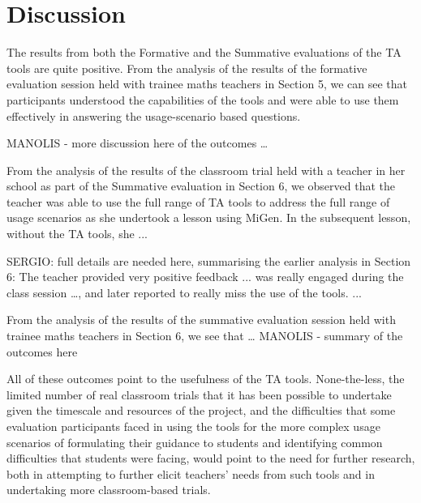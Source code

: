 
\section{Discussion}
\label{sec:discussion}

The results from both the Formative and the Summative evaluations of
the TA tools are quite positive. From the analysis of the results of
the formative evaluation session held with trainee maths teachers in
Section 5, we can see that participants understood the capabilities of
the tools and were able to use them effectively in answering the
usage-scenario based questions.

MANOLIS - more discussion here of the outcomes … 
 
From the analysis of the results of the classroom trial held with a
teacher in her school as part of the Summative evaluation in Section
6, we observed that the teacher was able to use the full range of TA
tools to address the full range of usage scenarios as she undertook a
lesson using MiGen. In the subsequent lesson, without the TA tools,
she ...

SERGIO:  full details are needed here, summarising the earlier analysis in Section 6: The teacher provided very positive feedback ... was really engaged during the class session …, and later reported to really miss the use of the tools. ...

From the analysis of the results of the summative evaluation session
held with trainee maths teachers in Section 6, we see that … MANOLIS -
summary of the outcomes here 

All of these outcomes point to the usefulness of the TA
tools. None-the-less, the limited number of real classroom trials that
it has been possible to undertake given the timescale and resources of
the project, and the difficulties that some evaluation participants
faced in using the tools for the more complex usage scenarios of
formulating their guidance to students and identifying common
difficulties that students were facing, would point to the need for
further research, both in attempting to further elicit teachers’ needs
from such tools and in undertaking more classroom-based trials.

